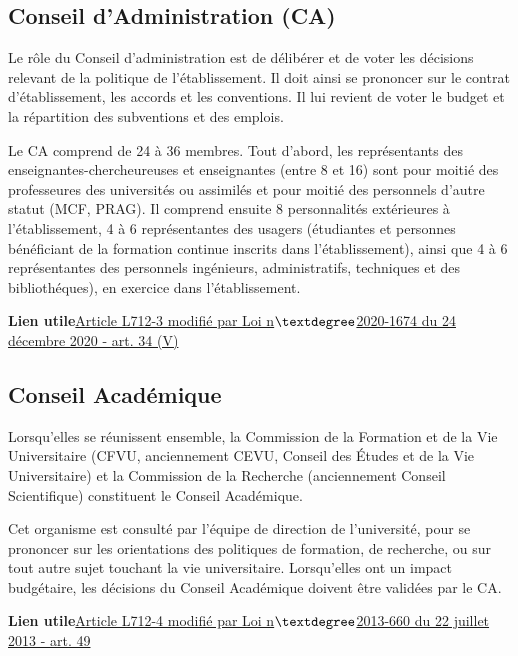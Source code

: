\subsection{Conseil d'Administration (CA)}
Le r\^ole du Conseil d'administration est de d\'elib\'erer et de voter les d\'ecisions relevant de la politique de l'\'etablissement. Il doit ainsi se prononcer sur
le contrat d'\'etablissement, les accords et les conventions. Il lui revient de voter le budget et la r\'epartition des subventions et des emplois. 

Le CA comprend de 24 \`a 36 membres. Tout d'abord, les repr\'esentants des enseignant\mp e\mp s-chercheur\mp euse\mp s et enseignant\mp e\mp s (entre 8 et 16)  sont pour moiti\'e des professeur\mp e\mp s des universit\'es ou assimil\'es et pour moiti\'e des personnels d'autre statut (MCF, PRAG). Il comprend ensuite 8 personnalit\'es ext\'erieures \`a l'\'etablissement, 4 \`a 6 repr\'esentant\mp e\mp s des usagers (\'etudiant\mp e\mp s et personnes b\'en\'eficiant de la formation continue inscrits dans l'\'etablissement),
ainsi que 4 \`a 6 repr\'esentant\mp e\mp s des personnels ing\'enieurs, administratifs, techniques et des biblioth\'eques), en exercice dans l'\'etablissement. 

\textbf{Lien utile\hspace{.5em}}\href{https://www.legifrance.gouv.fr/codes/article_lc/LEGIARTI000027747951/2023-04-15/}{Article L712-3 modifi\'e par Loi n$\textdegree$2020-1674 du 24 d\'ecembre 2020 - art. 34 (V)}

\subsection{Conseil Acad{\'e}mique}
Lorsqu'elles se r\'eunissent ensemble, la Commission de la Formation et de la Vie Universitaire 
(CFVU, anciennement CEVU, Conseil des {\'E}tudes et de la Vie Universitaire) et la Commission de la Recherche (anciennement Conseil Scientifique) constituent le Conseil Acad\'emique.

Cet organisme est consult\'e par l'\'equipe de direction de l'universit\'e, pour se prononcer sur les orientations des politiques de formation, de recherche, ou sur tout autre sujet touchant la vie universitaire. Lorsqu'elles ont un impact budg\'etaire, les d{\'e}cisions du Conseil Acad{\'e}mique doivent \^etre valid\'ees par le CA. 

\textbf{Lien utile\hspace{.5em}}\href{https://www.legifrance.gouv.fr/affichCodeArticle.do;jsessionid=C8BFF801F2976E9272297AB33338C553.tpdila14v_3?idArticle=LEGIARTI000027747976&cidTexte=LEGITEXT000006071191&dateTexte=20170113}{Article L712-4 modifi\'e par Loi n$\textdegree$2013-660 du 22 juillet 2013 - art. 49}


